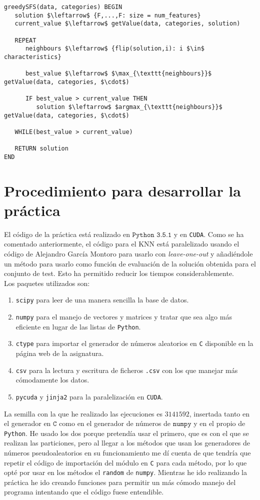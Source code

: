 \documentclass[11pt,leqno]{article}
\begin{document}
	\begin{lstlisting}[mathescape=true]
greedySFS(data, categories) BEGIN
   solution $\leftarrow$ {F,...,F: size = num_features}
   current_value $\leftarrow$ getValue(data, categories, solution)
   
   REPEAT
      neighbours $\leftarrow$ {flip(solution,i): i $\in$ characteristics}
   
      best_value $\leftarrow$ $\max_{\texttt{neighbours}}$ getValue(data, categories, $\cdot$)
      
      IF best_value > current_value THEN
         solution $\leftarrow$ $argmax_{\texttt{neighbours}}$ getValue(data, categories, $\cdot$)
   
   WHILE(best_value > current_value)
   
   RETURN solution
END
	\end{lstlisting}


\section{Procedimiento para desarrollar la práctica}

El código de la práctica está realizado en $\texttt{Python 3.5.1}$ y en \texttt{CUDA}. Como se ha comentado anteriormente, el código para el KNN está paralelizado usando el código de Alejandro García Montoro para usarlo con \textit{leave-one-out} y añadiéndole un método para usarlo como función de evaluación de la solución obtenida para el conjunto de test. Esto ha permitido reducir los tiempos considerablemente.\\
Los paquetes utilizados son:
\begin{enumerate}
	\item \texttt{scipy} para leer de una manera sencilla la base de datos.
	\item \texttt{numpy} para el manejo de vectores y matrices y tratar que sea algo más eficiente en lugar de las listas de \texttt{Python}.
	\item \texttt{ctype} para importar el generador de números aleatorios en \texttt{C} disponible en la página web de la asignatura. 
	\item \texttt{csv} para la lectura y escritura de ficheros \texttt{.csv} con los que manejar más cómodamente los datos.
	\item \texttt{pycuda} y \texttt{jinja2} para la paralelización en \texttt{CUDA}.
\end{enumerate}	

	La semilla con la que he realizado las ejecuciones es $3141592$, insertada tanto en el generador en $\texttt{C}$ como en el generador de números de $\texttt{numpy}$ y en el propio de \texttt{Python}. He usado los dos porque pretendía usar el primero, que es con el que se realizan las particiones, pero al llegar a los métodos que usan los generadores de números pseudoaleatorios en su funcionamiento me dí cuenta de que tendría que repetir el código de importación del módulo en \texttt{C} para cada método, por lo que opté por usar en los métodos el \texttt{random} de \texttt{numpy}. Mientras he ido realizando la práctica he ido creando funciones para permitir un más cómodo manejo del programa intentando que el código fuese entendible.
	
\end{document}
